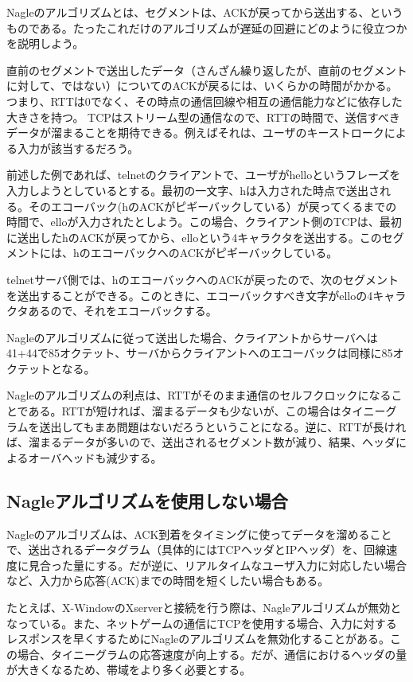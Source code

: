 Nagleのアルゴリズムとは、セグメントは、ACKが戻ってから送出する、というものである。たったこれだけのアルゴリズムが遅延の回避にどのように役立つかを説明しよう。

直前のセグメントで送出したデータ（さんざん繰り返したが、直前のセグメントに対して、ではない）についてのACKが戻るには、いくらかの時間がかかる。つまり、RTTは0でなく、その時点の通信回線や相互の通信能力などに依存した大きさを持つ。 TCPはストリーム型の通信なので、RTTの時間で、送信すべきデータが溜まることを期待できる。例えばそれは、ユーザのキーストロークによる入力が該当するだろう。

前述した例であれば、telnetのクライアントで、ユーザがhelloというフレーズを入力しようとしているとする。最初の一文字、hは入力された時点で送出される。そのエコーバック(hのACKがピギーバックしている）が戻ってくるまでの時間で、elloが入力されたとしよう。この場合、クライアント側のTCPは、最初に送出したhのACKが戻ってから、elloという4キャラクタを送出する。このセグメントには、hのエコーバックへのACKがピギーバックしている。

telnetサーバ側では、hのエコーバックへのACKが戻ったので、次のセグメントを送出することができる。このときに、エコーバックすべき文字がelloの4キャラクタあるので、それをエコーバックする。

Nagleのアルゴリズムに従って送出した場合、クライアントからサーバへは41+44で85オクテット、サーバからクライアントへのエコーバックは同様に85オクテットとなる。

Nagleのアルゴリズムの利点は、RTTがそのまま通信のセルフクロックになることである。RTTが短ければ、溜まるデータも少ないが、この場合はタイニーグラムを送出してもまあ問題はないだろうということになる。逆に、RTTが長ければ、溜まるデータが多いので、送出されるセグメント数が減り、結果、ヘッダによるオーバヘッドも減少する。

\subsection{Nagleアルゴリズムを使用しない場合}

Nagleのアルゴリズムは、ACK到着をタイミングに使ってデータを溜めることで、送出されるデータグラム（具体的にはTCPヘッダとIPヘッダ）を、回線速度に見合った量にする。だが逆に、リアルタイムなユーザ入力に対応したい場合など、入力から応答(ACK)までの時間を短くしたい場合もある。

たとえば、X-WindowのXserverと接続を行う際は、Nagleアルゴリズムが無効となっている。また、ネットゲームの通信にTCPを使用する場合、入力に対するレスポンスを早くするためにNagleのアルゴリズムを無効化することがある。この場合、タイニーグラムの応答速度が向上する。だが、通信におけるヘッダの量が大きくなるため、帯域をより多く必要とする。

